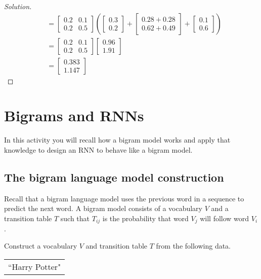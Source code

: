 \documentclass{article}
\begin{document}
\begin{proof}[Solution]
\begin{align*}
        & = \begin{bmatrix} 0.2 & 0.1 \\ 0.2  & 0.5 \end{bmatrix} \left( \begin{bmatrix} 0.3 \\ 0.2 \end{bmatrix} + \begin{bmatrix} 0.28 + 0.28 \\ 0.62 + 0.49 \end{bmatrix} + \begin{bmatrix} 0.1 \\ 0.6 \end{bmatrix} \right) \\
        & = \begin{bmatrix} 0.2 & 0.1 \\ 0.2  & 0.5 \end{bmatrix} \begin{bmatrix} 0.96 \\ 1.91 \end{bmatrix} \\
        & = \begin{bmatrix} 0.383 \\ 1.147 \end{bmatrix}
    \end{align*}
\end{proof}

\section{Bigrams and RNNs}
In this activity you will recall how a bigram model works and apply that knowledge to design an RNN to behave like a bigram model.

\subsection{The bigram language model construction}
Recall that a bigram language model uses the previous word in a sequence to predict the next word. A bigram model consists of a vocabulary $V$ and a transition table $T$ such that $T_{ij}$ is the probability that word $V_j$ will follow word $V_i$.

Construct a vocabulary $V$ and transition table $T$ from the following data.

\begin{center}
\begin{tabular}{l}
``Harry Potter"
\end{tabular}
\end{center}
\end{document}
